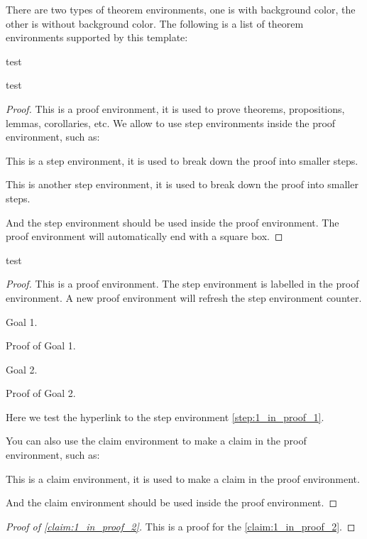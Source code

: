     There are two types of theorem environments, one is with background color, the other is without background color. 
    The following is a list of theorem environments supported by this template:

    \begin{definition}
        test    
    \end{definition}
    \begin{proposition}
        test 
    \end{proposition}
    \begin{proof}
        This is a proof environment, it is used to prove theorems, propositions, lemmas, corollaries, etc.
        We allow to use step environments inside the proof environment, such as:
        \begin{step}\label{step:1_in_proof_1}
            This is a step environment, it is used to break down the proof into smaller steps.
        \end{step}
        \begin{step}\label{step:2_in_proof_1}
            This is another step environment, it is used to break down the proof into smaller steps.
        \end{step}
        And the step environment should be used inside the proof environment.
        The proof environment will automatically end with a square box.
    \end{proof}
    
    \begin{theorem}
        test 
    \end{theorem}
    \begin{proof}
        This is a proof environment.
        The step environment is labelled in the proof environment.
        A new proof environment will refresh the step environment counter.
        \begin{step}\label{step:1_in_proof_2}
            Goal 1.
        \end{step}
        Proof of Goal 1.
        \begin{step}\label{step:2_in_proof_2}
            Goal 2.
        \end{step}
        Proof of Goal 2.

        Here we test the hyperlink to the step environment \cref{step:1_in_proof_1}.

        You can also use the claim environment to make a claim in the proof environment, such as:
        \begin{claim}\label{claim:1_in_proof_2}
            This is a claim environment, it is used to make a claim in the proof environment.
        \end{claim}
        And the claim environment should be used inside the proof environment.
    \end{proof}
    \begin{proof}[Proof of \cref{claim:1_in_proof_2}]
        This is a proof for the \cref{claim:1_in_proof_2}.
    \end{proof}

